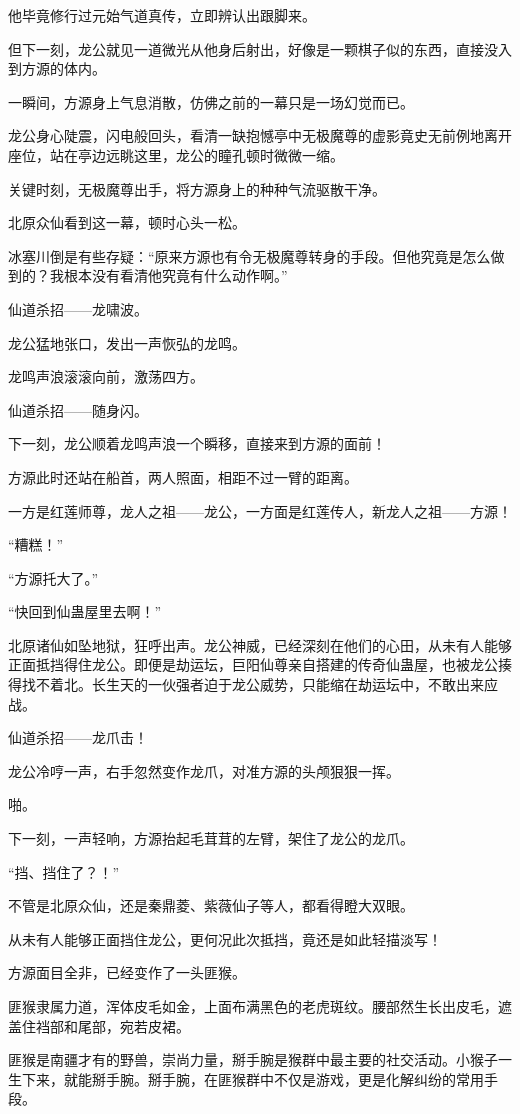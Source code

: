 \begin{this_body}
他毕竟修行过元始气道真传，立即辨认出跟脚来。

但下一刻，龙公就见一道微光从他身后射出，好像是一颗棋子似的东西，直接没入到方源的体内。

一瞬间，方源身上气息消散，仿佛之前的一幕只是一场幻觉而已。

龙公身心陡震，闪电般回头，看清一缺抱憾亭中无极魔尊的虚影竟史无前例地离开座位，站在亭边远眺这里，龙公的瞳孔顿时微微一缩。

关键时刻，无极魔尊出手，将方源身上的种种气流驱散干净。

北原众仙看到这一幕，顿时心头一松。

冰塞川倒是有些存疑：“原来方源也有令无极魔尊转身的手段。但他究竟是怎么做到的？我根本没有看清他究竟有什么动作啊。”

仙道杀招——龙啸波。

龙公猛地张口，发出一声恢弘的龙鸣。

龙鸣声浪滚滚向前，激荡四方。

仙道杀招——随身闪。

下一刻，龙公顺着龙鸣声浪一个瞬移，直接来到方源的面前！

方源此时还站在船首，两人照面，相距不过一臂的距离。

一方是红莲师尊，龙人之祖——龙公，一方面是红莲传人，新龙人之祖——方源！

“糟糕！”

“方源托大了。”

“快回到仙蛊屋里去啊！”

北原诸仙如坠地狱，狂呼出声。龙公神威，已经深刻在他们的心田，从未有人能够正面抵挡得住龙公。即便是劫运坛，巨阳仙尊亲自搭建的传奇仙蛊屋，也被龙公揍得找不着北。长生天的一伙强者迫于龙公威势，只能缩在劫运坛中，不敢出来应战。

仙道杀招——龙爪击！

龙公冷哼一声，右手忽然变作龙爪，对准方源的头颅狠狠一挥。

啪。

下一刻，一声轻响，方源抬起毛茸茸的左臂，架住了龙公的龙爪。

“挡、挡住了？！”

不管是北原众仙，还是秦鼎菱、紫薇仙子等人，都看得瞪大双眼。

从未有人能够正面挡住龙公，更何况此次抵挡，竟还是如此轻描淡写！

方源面目全非，已经变作了一头匪猴。

匪猴隶属力道，浑体皮毛如金，上面布满黑色的老虎斑纹。腰部然生长出皮毛，遮盖住裆部和尾部，宛若皮裙。

匪猴是南疆才有的野兽，崇尚力量，掰手腕是猴群中最主要的社交活动。小猴子一生下来，就能掰手腕。掰手腕，在匪猴群中不仅是游戏，更是化解纠纷的常用手段。


\end{this_body}
